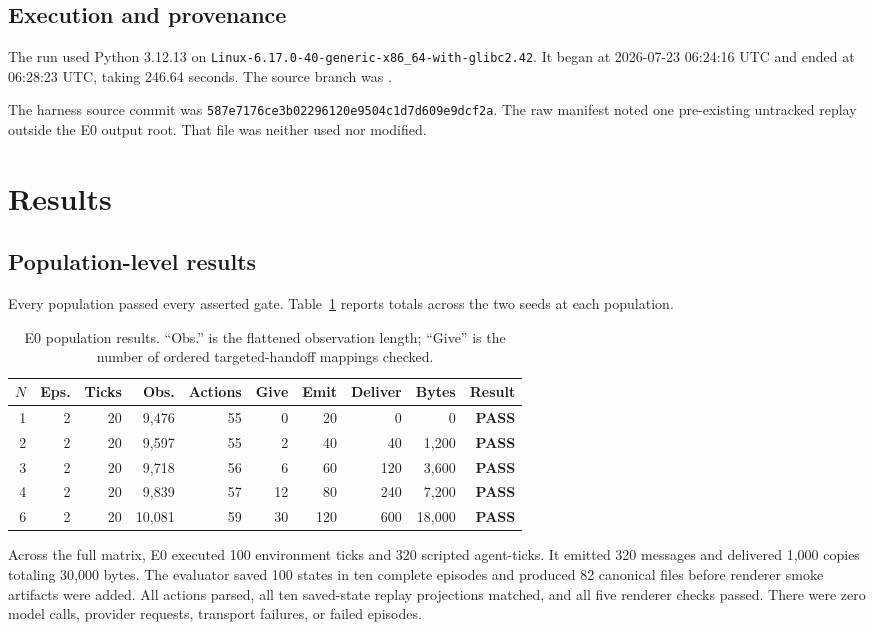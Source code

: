 \documentclass[11pt]{article}
\newcommand{\pass}{\textcolor{passgreen}{\textbf{PASS}}}
\newcommand{\code}[1]{\texttt{#1}}
\begin{document}
\subsection{Execution and provenance}

The run used Python 3.12.13 on
\code{Linux-6.17.0-40-generic-x86\_64-with-glibc2.42}.  It began at
2026-07-23 06:24:16 UTC and ended at 06:28:23 UTC, taking 246.64 seconds.
The source branch was
.

\noindent
The harness source commit was
\code{587e7176ce3b02296120e9504c1d7d609e9dcf2a}.  The raw manifest noted one
pre-existing untracked replay outside the E0 output root.  That file was neither
used nor modified.

\section{Results}

\subsection{Population-level results}

Every population passed every asserted gate.  Table~\ref{tab:populations} reports
totals across the two seeds at each population.

\begin{table}[ht]
\centering
\small
\begin{tabular}{rrrrrrrrrr}
\toprule
$N$ & Eps. & Ticks & Obs. & Actions & Give & Emit & Deliver & Bytes & Result\\
\midrule
1 & 2 & 20 & 9,476  & 55 & 0  & 20  & 0   & 0      & \pass\\
2 & 2 & 20 & 9,597  & 55 & 2  & 40  & 40  & 1,200  & \pass\\
3 & 2 & 20 & 9,718  & 56 & 6  & 60  & 120 & 3,600  & \pass\\
4 & 2 & 20 & 9,839  & 57 & 12 & 80  & 240 & 7,200  & \pass\\
6 & 2 & 20 & 10,081 & 59 & 30 & 120 & 600 & 18,000 & \pass\\
\bottomrule
\end{tabular}
\caption{E0 population results.  ``Obs.'' is the flattened observation length;
``Give'' is the number of ordered targeted-handoff mappings checked.}
\label{tab:populations}
\end{table}

Across the full matrix, E0 executed 100 environment ticks and 320 scripted
agent-ticks.  It emitted 320 messages and delivered 1,000 copies totaling 30,000
bytes.  The evaluator saved 100 states in ten complete episodes and produced 82
canonical files before renderer smoke artifacts were added.  All actions parsed,
all ten saved-state replay projections matched, and all five renderer checks
passed.  There were zero model calls, provider requests, transport failures, or
failed episodes.
\end{document}

